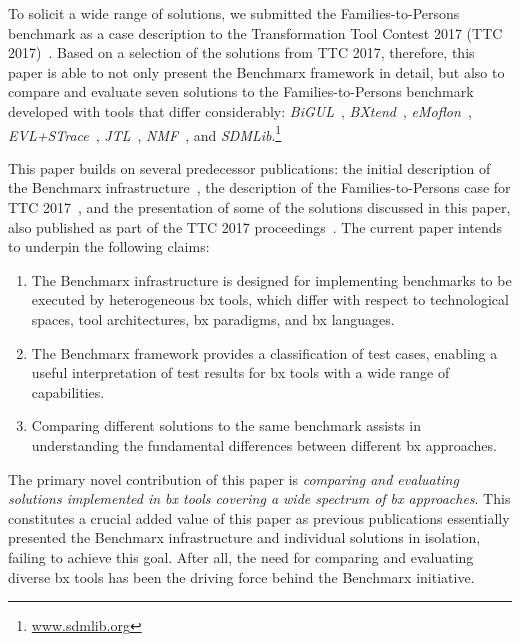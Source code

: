 To solicit a wide range of solutions, we submitted the Families-to-Persons benchmark as a case description to the Transformation Tool Contest 2017 (TTC 2017)~\cite{Anjorin2017a}.
Based on a selection of the solutions from TTC 2017, therefore, this paper is able to not only present the Benchmarx framework in detail, but also to compare and evaluate seven solutions to the Families-to-Persons benchmark developed with tools that differ considerably: 
\emph{BiGUL}~\cite{PEPM2016-Ko}, 
\emph{BXtend}~\cite{MODELSWARD2018-Buchmann}, 
\emph{eMoflon}~\cite{Leblebici2014a}, 
\emph{EVL+STrace}~\cite{IST2018-Samimi}, 
\emph{JTL}~\cite{SLE2010-Cicchetti}, 
\emph{NMF}~\cite{SoSyM2017-Hinkel},
and 
\emph{SDMLib}.\footnote{\url{www.sdmlib.org}}

This paper builds on several predecessor publications: the initial description of the Benchmarx infrastructure~\cite{Anjorin2017}, the description of the Families-to-Persons case for TTC 2017~\cite{Anjorin2017a}, and the presentation of some of the solutions discussed in this paper, also published as part of the TTC 2017 proceedings~\cite{Hinkel2017,Samimi-Dehkordi2017,Zundorf2017}. 
%
The current paper intends to underpin the following claims:

\begin{enumerate}
	\item The Benchmarx infrastructure is designed for implementing benchmarks to be executed by heterogeneous bx tools, which differ with respect to technological spaces, tool architectures, bx paradigms, and bx languages.
	\item The Benchmarx framework provides a classification of test cases, enabling a useful interpretation of test results for bx tools with a wide range of capabilities.  
	\item Comparing different solutions to the same benchmark assists in understanding the fundamental differences between different bx approaches.
\end{enumerate}

The primary novel contribution of this paper is \emph{comparing and evaluating solutions implemented in bx tools covering a wide spectrum of bx approaches}.
This constitutes a crucial added value of this paper as previous publications essentially presented the Benchmarx infrastructure and individual solutions in isolation, failing to achieve this goal. 
After all, the need for comparing and evaluating diverse bx tools has been the driving force behind the Benchmarx initiative.

